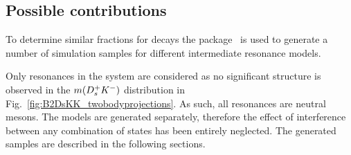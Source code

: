 

\subsection{Possible contributions}


To determine similar fractions for \decay{\Bp}{\Dsp\Kp\Km} decays the \laurapp package~\cite{1711.09854} is used to generate a number of simulation samples for different intermediate resonance models.

Only resonances in the \Kp\Km system are considered as no significant structure is observed in the $m({{D}^+_{s}}{{K}^-})$ distribution in Fig.~\ref{fig:B2DsKK_twobodyprojections}. As such, all resonances are neutral mesons. The models are generated separately, therefore the effect of interference between any combination of states has been entirely neglected.    
The generated samples are described in the following sections.

